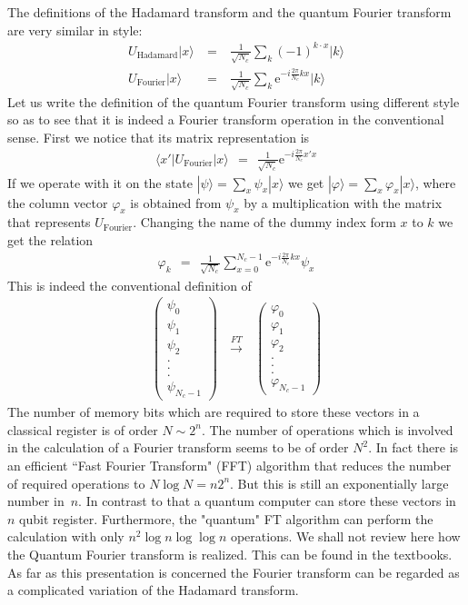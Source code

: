 \documentclass[onecolumn,fleqn, 11pt]{revtex4}
\newcommand{\eexp}{\mathrm{e}^}
\newcommand{\tbox}[1]{\text{#1}}
\newcommand{\beq}{\begin{eqnarray}}
\newcommand{\eeq}{\end{eqnarray}}
\begin{document}
The definitions of the Hadamard transform 
and the quantum Fourier transform are very similar in style:
\beq
U_{\tbox{Hadamard}}|x\rangle 
\ &=& \ \frac{1}{\sqrt{N_c}} \sum_k (-1)^{k\cdot x}|k\rangle
\\
U_{\tbox{Fourier}}|x\rangle 
\ &=& \ \frac{1}{\sqrt{N_c}} \sum_k \eexp{-i\frac{2\pi}{N_c}kx}|k\rangle
\eeq
Let us write the definition of the quantum Fourier transform
using different style so as to see that it is indeed a Fourier 
transform operation in the conventional sense. 
First we notice that its matrix representation is 
\beq
\langle x' |U_{\tbox{Fourier}}| x \rangle 
\ \ = \ \ \frac{1}{\sqrt{N_c}}  \eexp{-i \frac {2\pi}{N_c} x' x}
\eeq
If we operate with it 
on the state  $|\psi\rangle = \sum_x \psi_x |x\rangle$
we get $|\varphi \rangle = \sum_x \varphi_x |x\rangle$, 
where the column vector $\varphi_x$ is obtained from $\psi_x$ by 
a multiplication with the matrix that represents $U_{\tbox{Fourier}}$. 
Changing the name of the dummy index form $x$ to $k$ we get     
the relation
\beq
\varphi_k \ \ = \ \ \frac{1}{\sqrt{N_c}} \sum_{x=0}^{N_c-1} \eexp{-i \frac {2\pi}{N_c} kx} \psi_x
\eeq
This is indeed the conventional definition of 
\beq
\left( 
\begin{array}{c} 
\psi_0 \\ \psi_1 \\ \psi_2 \\ . \\ . \\ . \\ \psi_{N_c-1} 
\end{array} \right)
\ \ \ \overset{FT}{\longrightarrow} \ \ \ 
\left( 
\begin{array}{c} 
\varphi_0 \\ \varphi_1 \\ \varphi_2 \\ . \\ . \\ . \\ \varphi_{N_c-1} 
\end{array} \right)
\eeq
The number of memory bits which are required 
to store these vectors in a classical register 
is of order $N \sim 2^n$.  
The number of operations which is involved in 
the calculation of a Fourier transform  
seems to be of order $N^2$. 
In fact there is an efficient 
``Fast Fourier Transform" (FFT) algorithm that 
reduces the number of required operations to $N\log N = n2^n$. 
But this is still an exponentially large number in~$n$. 
In contrast to that a quantum computer can store  
these vectors in $n$ qubit register. Furthermore,  
the "quantum" FT algorithm can perform the calculation  
with only $n^2 \log n \log \log n$ operations. 
We shall not review here how the Quantum Fourier transform 
is realized. This can be found in the textbooks. 
As far as this presentation is concerned 
the Fourier transform can be regarded 
as a complicated variation of the Hadamard transform. 
\end{document}
